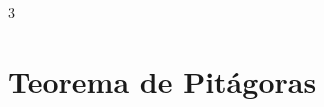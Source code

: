 \documentclass[12pt,addpoints,answers]{repaso}
\begin{document}
\begin{questions}
{\begin{multicols}{3}
        \end{multicols}
    }


    \section{Teorema de Pitágoras}



\end{questions}
\end{document}
